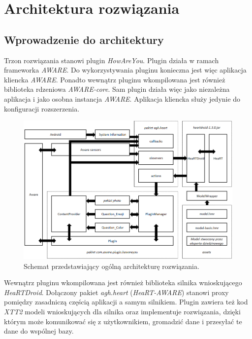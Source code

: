 \chapter{Architektura rozwiązania}
\label{cha:architekturaRozwiazania}


\section{Wprowadzenie do architektury}
\label{sec:wprowadzenieDoArchitektury}

Trzon rozwiązania stanowi plugin \textit{HowAreYou}. Plugin działa w ramach frameworka \textit{AWARE}. Do wykorzystywania pluginu konieczna jest więc aplikacja kliencka \textit{AWARE}. Ponadto wewnątrz pluginu wkompilowana jest również biblioteka rdzeniowa \textit{AWARE-core}. Sam plugin działa więc jako niezależna aplikacja i jako osobna instancja \textit{AWARE}. Aplikacja kliencka służy jedynie do konfiguracji rozszerzenia.

\begin{figure}[H]
	\centering
	\includegraphics[scale=0.8]{rozdzial3/ArchitekturaSchemat.png}
	\caption{Schemat przedstawiający ogólną architekturę rozwiązania.}
\end{figure}

Wewnątrz pluginu wkompilowana jest również biblioteka silnika wnioskującego \textit{HeaRTDroid}. Dołączony pakiet \textit{agh.heart} (\textit{HeaRT-AWARE}) stanowi proxy pomiędzy zasadniczą częścią aplikacji a samym silnikiem. Plugin zawiera też kod \textit{XTT2} modeli wnioskujących dla silnika oraz implementuje rozwiązania, dzięki którym może komunikować się z użytkownikiem, gromadzić dane i przesyłać te dane do wspólnej bazy. 

